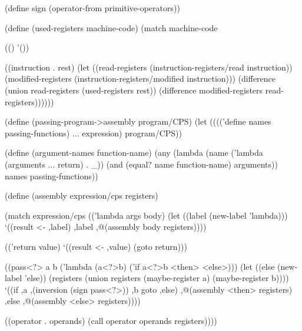 \begin{Snippet}
(define sign (operator-from primitive-operators))
\end{Snippet}
\begin{Snippet}
(define (used-registers machine-code)
  (match machine-code
\end{Snippet}
\begin{Snippet}
    (()
     '())
\end{Snippet}
\begin{Snippet}
    ((instruction . rest)
     (let ((read-registers (instruction-registers/read instruction))
	   (modified-registers (instruction-registers/modified instruction)))
       (difference (union read-registers (used-registers rest))
		   (difference modified-registers read-registers))))))
\end{Snippet}
\begin{Snippet}
(define (passing-program->assembly program/CPS)
  (let (((('define names passing-functions)
	  ...
	  expression) program/CPS))
\end{Snippet}
\begin{Snippet}
    (define (argument-names function-name)
      (any (lambda (name ('lambda (arguments ... return) . _))
             (and (equal? name function-name)
                  arguments))
           names passing-functions))
\end{Snippet}
\begin{Snippet}
    (define (assembly expression/cps registers)
\end{Snippet}
\begin{Snippet}
      (match expression/cps
	(('lambda args body)
	 (let ((label (new-label 'lambda)))
	   `((result <- ,label)
	     ,label
	     ,@(assembly body registers))))
\end{Snippet}
\begin{Snippet}
        (('return value)
         `((result <- ,value)
           (goto return)))
\end{Snippet}
\begin{Snippet}
	((pass<?> a b ('lambda (a<?>b) ('if a<?>b
				       <then>
				       <else>)))
          (let ((else (new-label 'else))
                (registers (union registers
                                  (maybe-register a)
                                  (maybe-register b))))
            `((if ,a ,(inversion (sign pass<?>)) ,b goto ,else)
	      ,@(assembly <then> registers)
	      ,else
	      ,@(assembly <else> registers))))
\end{Snippet}
\begin{Snippet}
	((operator . operands)
         (call operator operands registers))))
\end{Snippet}
